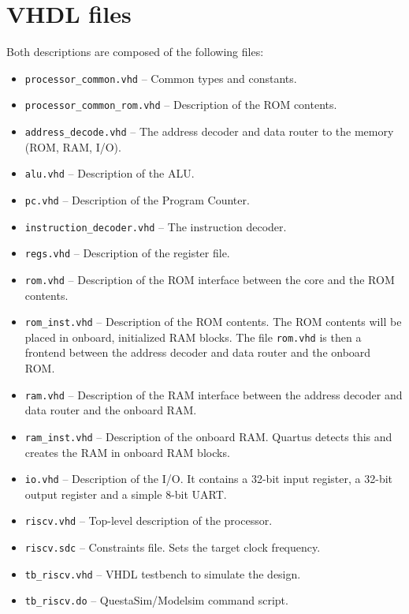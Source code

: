 \documentclass[12pt]{article}
\begin{document}
\section{VHDL files}
Both descriptions are composed of the following files:

\begin{itemize}
\item \lstinline|processor_common.vhd| -- Common types and constants.
\item \lstinline|processor_common_rom.vhd| -- Description of the ROM contents.
\item \lstinline|address_decode.vhd| -- The address decoder and data router to the memory (ROM, RAM, I/O).
\item \lstinline|alu.vhd| -- Description of the ALU.
\item \lstinline|pc.vhd| -- Description of the Program Counter.
\item \lstinline|instruction_decoder.vhd| -- The instruction decoder.
\item \lstinline|regs.vhd| -- Description of the register file.
\item \lstinline|rom.vhd| -- Description of the ROM interface between the core and the ROM contents.
\item \lstinline|rom_inst.vhd| -- Description of the ROM contents. The ROM contents will be placed in onboard, initialized RAM blocks. The file \lstinline|rom.vhd| is then a frontend between the address decoder and data router and the onboard ROM.
\item \lstinline|ram.vhd| -- Description of the RAM interface between the address decoder and data router and the onboard RAM.
\item \lstinline|ram_inst.vhd| -- Description of the onboard RAM. Quartus detects this and creates the RAM in onboard RAM blocks.
\item \lstinline|io.vhd| -- Description of the I/O. It contains a 32-bit input register, a 32-bit output register and a simple 8-bit UART.
\item \lstinline|riscv.vhd| -- Top-level description of the processor.
\item \lstinline|riscv.sdc| -- Constraints file. Sets the target clock frequency.
\item \lstinline|tb_riscv.vhd| -- VHDL testbench to simulate the design.
\item \lstinline|tb_riscv.do| -- QuestaSim/Modelsim command script.
\end{itemize}
\end{document}
